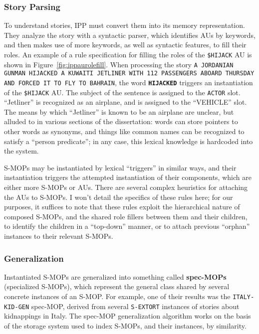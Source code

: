 \subsubsection{Story Parsing}
To understand stories, IPP must convert them into its memory representation. They analyze the story with a syntactic parser, which identifies AUs by keywords, and then makes use of more keywords, as well as syntactic features, to fill their roles. An example of a rule specification for filling the roles of the \texttt{\$HIJACK} AU is shown in Figure~\ref{fig:ippaurolefill}. When processing the story \texttt{A JORDANIAN GUNMAN HIJACKED A KUWAITI JETLINER WITH
112 PASSENGERS ABOARD THURSDAY AND FORCED IT TO FLY TO
BAHRAIN}, the word \texttt{\textbf{HIJACKED}} triggers an instantiation of the \texttt{\$HIJACK} AU. The subject of the sentence is assigned to the \texttt{ACTOR} slot. ``Jetliner'' is recognized as an airplane, and is assigned to the ``VEHICLE'' slot. The means by which ``Jetliner'' is known to be an airplane are unclear, but alluded to in various sections of the dissertation: words can store pointers to other words as synonyms, and things like common names can be recognized to satisfy a ``person predicate''; in any case, this lexical knowledge is hardcoded into the system.

S-MOPs may be instantiated by lexical ``triggers'' in similar ways, and their instantiation triggers the attempted instantiation of their components, which are either more S-MOPs or AUs. There are several complex heuristics for attaching the AUs to S-MOPs. I won't detail the specifics of these rules here; for our purposes, it suffices to note that these rules exploit the hierarchical nature of composed S-MOPs, and the shared role fillers between them and their children, to identify the children in a ``top-down'' manner, or to attach previous ``orphan'' instances to their relevant S-MOPs.

\subsubsection{Generalization}
Instantiated S-MOPs are generalized into something called \textbf{spec-MOPs} (specialized S-MOPs), which represent the general class shared by several concrete instances of an S-MOP. For example, one of their results was the \texttt{ITALY-KID-GEN} spec-MOP, derived from several \texttt{S-EXTORT} instances of stories about kidnappings in Italy. The spec-MOP generalization algorithm works on the basis of the storage system used to index S-MOPs, and their instances, by similarity.

